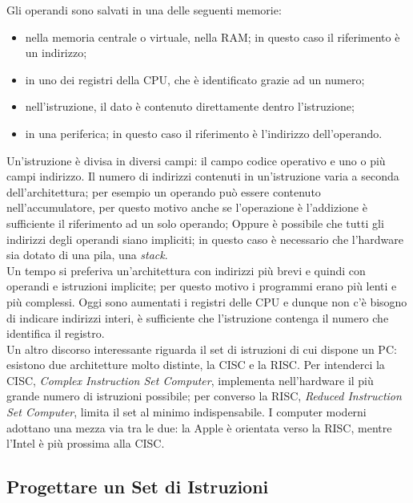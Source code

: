 \documentclass{article}
\begin{document}
Gli operandi sono salvati in una delle seguenti memorie:
\begin{itemize}
	\item nella memoria centrale o virtuale, nella RAM; in questo caso il riferimento è un indirizzo;

	\item in uno dei registri della CPU, che è identificato grazie ad un numero;

	\item nell'istruzione, il dato è contenuto direttamente dentro l'istruzione;

	\item in una periferica; in questo caso il riferimento è l'indirizzo dell'operando.
\end{itemize}

Un'istruzione è divisa in diversi campi: il campo codice operativo e uno o più campi indirizzo.
Il numero di indirizzi contenuti in un'istruzione varia a seconda dell'architettura; per esempio un operando può essere contenuto nell'accumulatore, per questo motivo anche se l'operazione è l'addizione è sufficiente il riferimento ad un solo operando;
Oppure è possibile che tutti gli indirizzi degli operandi siano impliciti; in questo caso è necessario che l'hardware sia dotato di una pila, una \textit{stack}.\\

Un tempo si preferiva un'architettura con indirizzi più brevi e quindi con operandi e istruzioni implicite; per questo motivo i programmi erano più lenti e più complessi. Oggi sono aumentati i registri delle CPU e dunque non c'è bisogno di indicare indirizzi interi, è sufficiente che l'istruzione contenga il numero che identifica il registro.\\

Un altro discorso interessante riguarda il set di istruzioni di cui dispone un PC: esistono due architetture molto distinte, la CISC e la RISC. Per intenderci la CISC, \textit{Complex Instruction Set Computer}, implementa nell'hardware il più grande numero di istruzioni possibile; per converso la RISC, \textit{Reduced Instruction Set Computer}, limita il set al minimo indispensabile. I computer moderni adottano una mezza via tra le due: la Apple è orientata verso la RISC, mentre l'Intel è più prossima alla CISC.

\subsection{Progettare un Set di Istruzioni}
\end{document}
